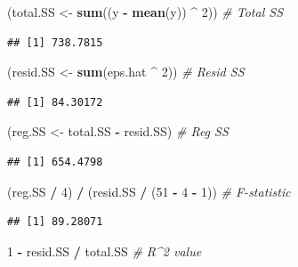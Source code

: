 \documentclass[]{article}
\newenvironment{Shaded}{\begin{snugshade}}{\end{snugshade}}
\newcommand{\CommentTok}[1]{\textcolor[rgb]{0.56,0.35,0.01}{\textit{#1}}}
\newcommand{\DecValTok}[1]{\textcolor[rgb]{0.00,0.00,0.81}{#1}}
\newcommand{\KeywordTok}[1]{\textcolor[rgb]{0.13,0.29,0.53}{\textbf{#1}}}
\newcommand{\NormalTok}[1]{#1}
\newcommand{\OperatorTok}[1]{\textcolor[rgb]{0.81,0.36,0.00}{\textbf{#1}}}
\newcommand{\StringTok}[1]{\textcolor[rgb]{0.31,0.60,0.02}{#1}}
\begin{document}
\begin{Shaded}
\begin{Highlighting}[]
\NormalTok{(total.SS <-}\StringTok{ }\KeywordTok{sum}\NormalTok{((y }\OperatorTok{-}\StringTok{ }\KeywordTok{mean}\NormalTok{(y)) }\OperatorTok{^}\StringTok{ }\DecValTok{2}\NormalTok{))  }\CommentTok{# Total SS}
\end{Highlighting}
\end{Shaded}

\begin{verbatim}
## [1] 738.7815
\end{verbatim}

\begin{Shaded}
\begin{Highlighting}[]
\NormalTok{(resid.SS <-}\StringTok{ }\KeywordTok{sum}\NormalTok{(eps.hat }\OperatorTok{^}\StringTok{ }\DecValTok{2}\NormalTok{))  }\CommentTok{# Resid SS}
\end{Highlighting}
\end{Shaded}

\begin{verbatim}
## [1] 84.30172
\end{verbatim}

\begin{Shaded}
\begin{Highlighting}[]
\NormalTok{(reg.SS <-}\StringTok{ }\NormalTok{total.SS }\OperatorTok{-}\StringTok{ }\NormalTok{resid.SS)  }\CommentTok{# Reg SS}
\end{Highlighting}
\end{Shaded}

\begin{verbatim}
## [1] 654.4798
\end{verbatim}

\begin{Shaded}
\begin{Highlighting}[]
\NormalTok{(reg.SS }\OperatorTok{/}\StringTok{ }\DecValTok{4}\NormalTok{) }\OperatorTok{/}\StringTok{ }\NormalTok{(resid.SS }\OperatorTok{/}\StringTok{ }\NormalTok{(}\DecValTok{51} \OperatorTok{-}\StringTok{ }\DecValTok{4} \OperatorTok{-}\StringTok{ }\DecValTok{1}\NormalTok{))  }\CommentTok{# F-statistic }
\end{Highlighting}
\end{Shaded}

\begin{verbatim}
## [1] 89.28071
\end{verbatim}

\begin{Shaded}
\begin{Highlighting}[]
\DecValTok{1} \OperatorTok{-}\StringTok{ }\NormalTok{resid.SS }\OperatorTok{/}\StringTok{ }\NormalTok{total.SS  }\CommentTok{# R^2 value}
\end{Highlighting}
\end{Shaded}
\end{document}
